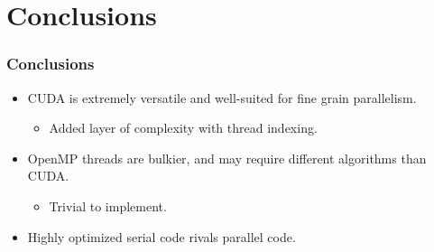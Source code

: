 \documentclass{beamer}
\begin{document}
\section{Conclusions}
\begin{frame}
\frametitle{Conclusions}
\begin{itemize}
\item{CUDA is extremely versatile and well-suited for fine grain parallelism.
     \begin{itemize}
     \item{Added layer of complexity with thread indexing.}
     \end{itemize}
     }
\item{OpenMP threads are bulkier, and may require different algorithms than CUDA.
     \begin{itemize}
     \item{Trivial to implement.}
     \end{itemize}
     }
\item{Highly optimized serial code rivals parallel code.}
\end{itemize}
\end{frame}
\end{document}
